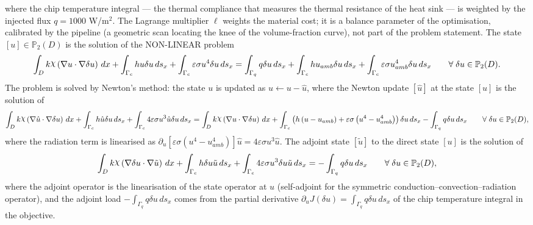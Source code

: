 \documentclass[preview]{standalone}
\let\oldcdot\cdot
\let\cdot\oldcdot
\begin{document}
where the chip temperature integral — the thermal compliance that measures the thermal resistance of the heat sink — is weighted by the injected flux $q = 1000$ W/m$^{2}$.  The Lagrange multiplier $\ell$ weights the material cost; it is a balance parameter of the optimisation, calibrated by the pipeline (a geometric scan locating the knee of the volume-fraction curve), not part of the problem statement.
The state $\left[ u\right] \in \mathbb P_{2}(D)$ is the solution of the NON-LINEAR problem
\begin{dmath*}
\int_{D} k \raisebox{\depth}{$\chi$} \left(  \nabla u  \cdot  \nabla \delta u  \right) \,dx + \int_{\Gamma_c} h u \delta u \,ds_x + \int_{\Gamma_c} \varepsilon \sigma u^{4} \delta u \,ds_x = \int_{\Gamma_q} q  \delta u \,ds_x + \int_{\Gamma_c} h u_{amb} \delta u \,ds_x + \int_{\Gamma_c} \varepsilon \sigma u_{amb}^{4} \delta u \,ds_x \qquad \forall\; {\delta u\in \mathbb P_{2}(D)} .
\end{dmath*}
The problem is solved by Newton's method: the state $u$ is updated as $u \leftarrow u - \hat u$, where the Newton update $\left[ \hat u\right]$ at the state $\left[ u\right]$ is the solution of
\begin{dmath*}
\int_{D} k \raisebox{\depth}{$\chi$} \left(  \nabla \hat u  \cdot  \nabla \delta u  \right) \,dx + \int_{\Gamma_c} h \hat u \delta u \,ds_x + \int_{\Gamma_c} 4 \varepsilon \sigma u^{3} \hat u \delta u \,ds_x = \int_{D} k \raisebox{\depth}{$\chi$} \left(  \nabla u  \cdot  \nabla \delta u  \right) \,dx + \int_{\Gamma_c} \left( h \left( u - u_{amb}\right) + \varepsilon \sigma \left( u^{4} - u_{amb}^{4}\right)\right) \delta u \,ds_x - \int_{\Gamma_q} q  \delta u \,ds_x \qquad \forall\; {\delta u\in \mathbb P_{2}(D)} ,
\end{dmath*}
where the radiation term is linearised as $\partial_{u} \left[ \varepsilon \sigma \left( u^{4} - u_{amb}^{4}\right)\right] \hat u = 4 \varepsilon \sigma u^{3} \hat u$.
The adjoint state $\left[ \tilde u\right]$ to the direct state $\left[ u\right]$ is the solution of
\begin{dmath*}
\int_{D} k \raisebox{\depth}{$\chi$} \left(  \nabla \delta u  \cdot  \nabla \tilde u  \right) \,dx + \int_{\Gamma_c} h \delta u \tilde u \,ds_x + \int_{\Gamma_c} 4 \varepsilon \sigma u^{3} \delta u \tilde u \,ds_x = - \int_{\Gamma_q} q \delta u \,ds_x \qquad \forall\; {\delta u\in \mathbb P_{2}(D)} ,
\end{dmath*}
where the adjoint operator is the linearisation of the state operator at $u$ (self-adjoint for the symmetric conduction--convection--radiation operator), and the adjoint load $- \int_{\Gamma_q} q \delta u \,ds_x$ comes from the partial derivative $\partial_{u} J(\delta u) = \int_{\Gamma_q} q \delta u \,ds_x$ of the chip temperature integral in the objective.
\end{document}
